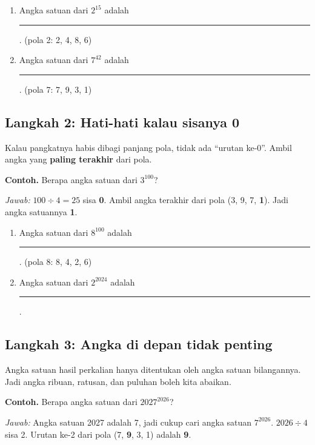 \documentclass[11pt,a4paper]{article}
\newcommand{\kosong}{\rule{1.2cm}{0.4pt}}
\begin{document}
\begin{giliranmu}
\begin{enumerate}[label=\alph*.]
    \item Angka satuan dari $2^{15}$ adalah \kosong. \quad (pola 2: 2, 4, 8, 6)
    \item Angka satuan dari $7^{42}$ adalah \kosong. \quad (pola 7: 7, 9, 3, 1)
\end{enumerate}
\end{giliranmu}

\subsection*{Langkah 2: Hati-hati kalau sisanya 0}
Kalau pangkatnya habis dibagi panjang pola, tidak ada ``urutan ke-0''. Ambil angka yang
\textbf{paling terakhir} dari pola.

\begin{contoh}
\textbf{Contoh.} Berapa angka satuan dari $3^{100}$?

\textit{Jawab:} $100 \div 4 = 25$ sisa \textbf{0}. Ambil angka terakhir dari pola
(3, 9, 7, \textbf{1}). Jadi angka satuannya \textbf{1}.
\end{contoh}

\begin{giliranmu}
\begin{enumerate}[label=\alph*.]
    \item Angka satuan dari $8^{100}$ adalah \kosong. \quad (pola 8: 8, 4, 2, 6)
    \item Angka satuan dari $2^{2024}$ adalah \kosong.
\end{enumerate}
\end{giliranmu}

\subsection*{Langkah 3: Angka di depan tidak penting}
Angka satuan hasil perkalian hanya ditentukan oleh angka satuan bilangannya. Jadi angka
ribuan, ratusan, dan puluhan boleh kita abaikan.

\begin{contoh}
\textbf{Contoh.} Berapa angka satuan dari $2027^{2026}$?

\textit{Jawab:} Angka satuan 2027 adalah 7, jadi cukup cari angka satuan $7^{2026}$.
$2026 \div 4$ sisa 2. Urutan ke-2 dari pola (7, \textbf{9}, 3, 1) adalah \textbf{9}.
\end{contoh}
\end{document}
